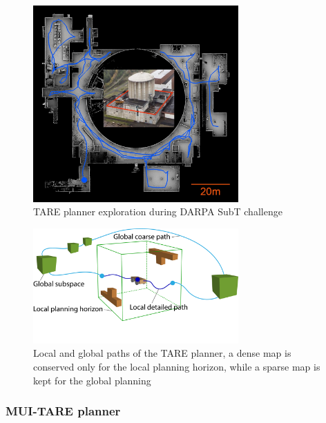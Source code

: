 \documentclass[12pt]{article}
\begin{document}
        \begin{figure}[H]
            \centering
            \includegraphics[width=0.7\textwidth]{Images/tare_darpa_exploration.jpg}
            \caption{TARE planner exploration during DARPA SubT challenge}
            \label{fig:tare_darpa_exploration}
        \end{figure}

        \begin{figure}[H]
            \centering
            \includegraphics[width=0.7\textwidth]{Images/tare.pdf}
            \caption{Local and global paths of the TARE planner, a dense map is conserved only for the local planning horizon, while a sparse map is kept for the global planning}
            \label{fig:tare_local_global}
        \end{figure}


        
        \subsubsection{MUI-TARE planner}
\end{document}
